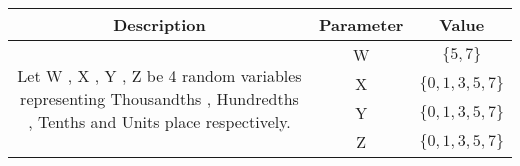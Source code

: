

\providecommand{\pr}[1]{\ensuremath{\Pr\left(#1\right)}}


\begin{center}
\large \begin{tabular}{|c|c|c|}
     \hline
     Description & Parameter & Value  \\
     \hline 
     \multirow{4}{*}{\parbox{6cm}{Let W , X , Y , Z be 4 random variables representing Thousandths , Hundredths , Tenths and Units place respectively.}} & W &  $\{5,7\}$ \\
                          & X &  $\{0,1,3,5,7\}$  \\
                          & Y &  $\{0,1,3,5,7\}$  \\
                          & Z &  $\{0,1,3,5,7\}$  \\
     \hline
 \end{tabular} 
 \end{center}



